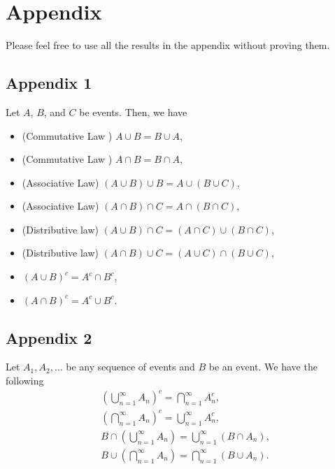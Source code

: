 \documentclass[11pt]{article}
\begin{document}
\newpage

\section{Appendix}

Please feel free to use all the results in the appendix without proving them.

\subsection{Appendix 1}

Let $A$, $B$, and $C$ be events. Then, we have
\begin{itemize}
\item (Commutative Law ) $A\cup B=B\cup A$,
\item (Commutative Law ) $A\cap B= B\cap A$,
\item (Associative Law) $(A\cup B)\cup B=A\cup (B\cup C)$,
\item (Associative Law) $(A\cap B)\cap C= A\cap(B\cap C)$,
\item (Distributive law) $(A\cup B)\cap C=(A\cap C)\cup (B\cap C)$,
\item (Distributive law) $(A\cap B)\cup C=(A\cup C)\cap (B\cup C)$,
\item $ (A\cup B)^c=A^c\cap B^c$,
\item $ (A\cap B)^c=A^c\cup B^c$.
\end{itemize}

\subsection{Appendix 2}

Let $A_1,A_2,\ldots$ be any sequence of events and $B$ be an event. We have the following
\begin{align*}
& \left(\bigcup_{n=1}^\infty A_n\right)^c = \bigcap_{n=1}^\infty A_n^c, \\
& \left(\bigcap_{n=1}^\infty A_n\right)^c = \bigcup_{n=1}^\infty A_n^c, \\
& B\cap\left(\bigcup_{n=1}^\infty A_n\right) = \bigcup_{n=1}^\infty (B\cap A_n),\\
& B\cup\left(\bigcap_{n=1}^\infty A_n\right) = \bigcap_{n=1}^\infty (B\cup A_n).
\end{align*}
\end{document}
